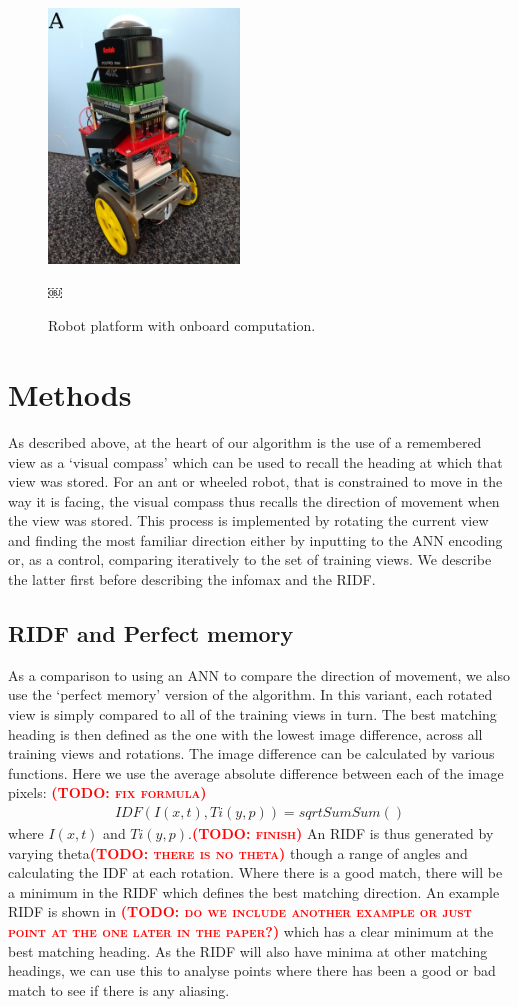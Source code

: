 \documentclass[letterpaper]{article}
\newcommand{\todo}[1]{\textbf{\textsc{\textcolor{red}{(TODO: #1)}}}}
\begin{document}
\begin{figure}[t]
    \centering
    \includegraphics[width=2in]{figures/robot.jpg}
    \caption{Robot platform with onboard computation.}￼
    \label{fig:robot}
\end{figure}

\section{Methods}
As described above, at the heart of our algorithm is the use of a remembered view as a `visual compass' which can be used to recall the heading at which that view was stored. 
For an ant or wheeled robot, that is constrained to move in the way it is facing, the visual compass thus recalls the direction of movement when the view was stored. 
This process is implemented by rotating the current view and finding the most familiar direction either by inputting to the ANN encoding or, as a control, comparing iteratively to the set of training views. 
We describe the latter first before describing the infomax and the RIDF.

\subsection{RIDF and Perfect memory}
\label{sec:navigation_algorithms}
As a comparison to using an ANN to compare the direction of movement, we also use the `perfect memory' version of the algorithm. 
In this variant, each rotated view is simply compared to all of the training views in turn. 
The best matching heading is then defined as the one with the lowest image difference, across all training views and rotations. 
The image difference can be calculated by various functions. 
Here we use the average absolute difference between each of the image pixels: \todo{fix formula}
%
\begin{align}
    IDF(I(x,t),Ti(y,p)) = sqrt Sum Sum ()
\end{align}
%
where $I(x,t)$ and $Ti(y,p)$.\todo{finish} 
An RIDF is thus generated by varying theta\todo{there is no theta} though a range of angles and calculating the IDF at each rotation. 
Where there is a good match, there will be a minimum in the RIDF which defines the best matching direction. 
An example RIDF is shown in \todo{do we include another example or just point at the one later in the paper?} which has a clear minimum at the best matching heading.
As the RIDF will also have minima at other matching headings, we can use this to analyse points where there has been a good or bad match to see if there is any aliasing.  
\end{document}
